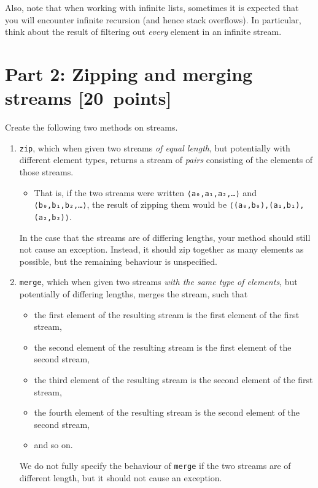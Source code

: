 \documentclass[11pt]{article}
\begin{document}
Also, note that when working with infinite lists,
sometimes it is expected that you will encounter infinite recursion
(and hence stack overflows).
In particular, think about the result of filtering out \emph{every} element
in an infinite stream.

\section*{Part 2: Zipping and merging streams             [20 points]}
\label{sec:org83ca29f}
Create the following two methods on streams.
\begin{enumerate}
\item \texttt{zip}, which when given two streams \emph{of equal length},
but potentially with different element types,
returns a stream of \emph{pairs} consisting of the elements of those streams.
\begin{itemize}
\item That is, if the two streams were
written \texttt{⟨a₀,a₁,a₂,…⟩} and \texttt{⟨b₀,b₁,b₂,…⟩},
the result of zipping them would be \texttt{⟨(a₀,b₀),(a₁,b₁),(a₂,b₂)⟩}.
\end{itemize}
In the case that the streams are of differing lengths,
your method should still not cause an exception.
Instead, it should zip together as many elements as possible,
but the remaining behaviour is unspecified.

\item \texttt{merge}, which when given two streams \emph{with the same type of elements},
but potentially of differing lengths,
merges the stream, such that
\begin{itemize}
\item the first element of the resulting stream
is the first element of the first stream,
\item the second element of the resulting stream
is the first element of the second stream,
\item the third element of the resulting stream
is the second element of the first stream,
\item the fourth element of the resulting stream
is the second element of the second stream,
\item and so on.
\end{itemize}
We do not fully specify the behaviour of \texttt{merge} if the two streams
are of different length, but it should not cause an exception.
\end{enumerate}
\end{document}
